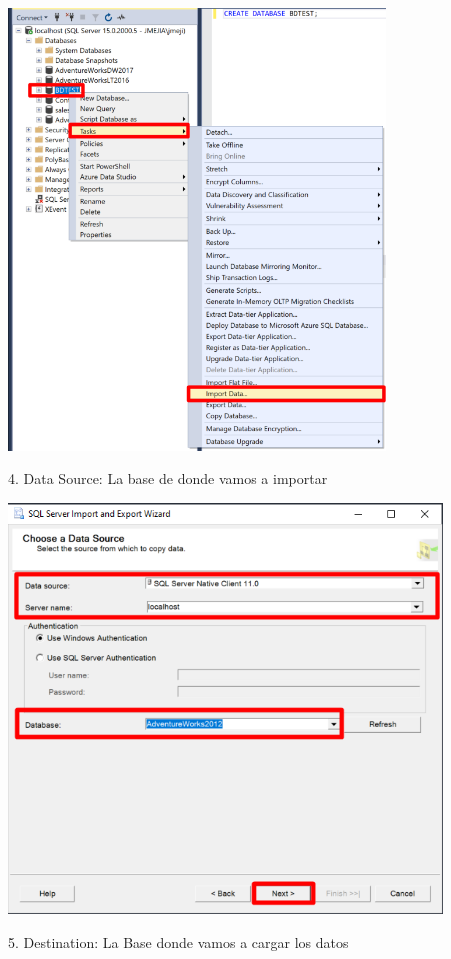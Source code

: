 \documentclass[12pt,letterpaper]{article}
\begin{document}
	\begin{center}
	\includegraphics[width=10cm]{./img/3}
	\end{center}	
4. Data Source: La base de donde vamos a importar 
	\begin{center}
	\includegraphics[width=11.5cm]{./img/4}
	\end{center}	
5. Destination: La Base donde vamos a cargar los datos
\end{document}
